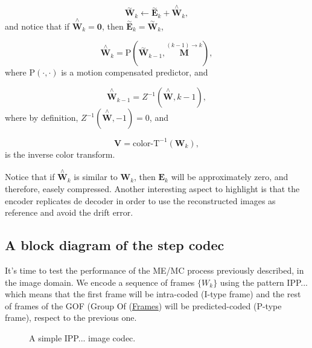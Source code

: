 \begin{equation}
  \overset{\sim}{\mathbf W}_k \leftarrow \overset{\sim}{\mathbf E}_k + \overset{\wedge}{\mathbf W}_k,
  \tag{i}
\end{equation}
and notice that if $\overset{\wedge}{\mathbf W}_k = {\mathbf 0}$, then
$\overset{\sim}{\mathbf E}_k = \overset{\sim}{\mathbf W}_k$,

\begin{equation}
  \overset{\wedge}{\mathbf W}_k = \text{P}(\overset{\sim}{\mathbf W}_{k-1}, \overset{(k-1)\rightarrow k}{\mathbf M}),
  \tag{j}
\end{equation}
where P$(\cdot,\cdot)$ is a motion compensated predictor, and

\begin{equation}
   \overset{\wedge}{\mathbf W}_{k-1} = Z^{-1}(\overset{\wedge}{\mathbf W}, k-1),
  \tag{k}
\end{equation}
where by definition, $Z^{-1}(\overset{\wedge}{\mathbf W}, -1) = 0$, and

\begin{equation}
   {\mathbf V} = \text{color-T}^{-1}({\mathbf W}_k),
  \tag{l}
\end{equation}
is the inverse color transform.

Notice that if $\overset{\wedge}{{\mathbf W}}_k$ is similar to
${\mathbf W}_k$, then ${\mathbf E}_k$ will be approximately zero, and
therefore, easely compressed. Another interesting aspect to highlight
is that the encoder replicates de decoder in order to use the
reconstructed images as reference and avoid the drift error.

\subsection{A block diagram of the step codec}

It's time to test the performance of the ME/MC process previously
described, in the image domain. We encode a sequence of
frames $\{W_k\}$ using the pattern IPP... which means that the first
frame will be intra-coded (I-type frame) and the rest of frames of the
GOF (Group Of
(\href{https://en.wikipedia.org/wiki/Group_of_pictures}{Frames}) will
be predicted-coded (P-type frame), respect to the previous one.

\begin{figure}
  \centering
  \caption{A simple IPP... image codec.}
\label{fig:IPP_codec}
\end{figure}


